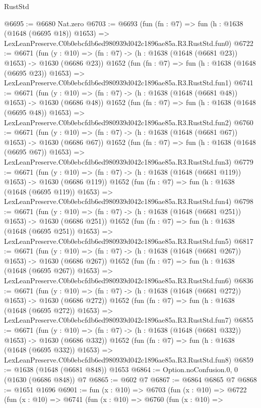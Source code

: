 \begin{lexlean}{RustStd}
\begin{coremodule}
@6695 := @6680 Nat.zero
@6703 := @6693
    (fun (fn : @7) =>
    fun (h : @1638 (@1648 (@6695 @18)) @1653) =>
    LexLeanPreserve.C0b0ebcfdb6ed980939d042c1896ae85a.R3.RustStd.fun0)
@6722 := @6671
    (fun (y : @10) => (fn : @7) -> (h : @1638 (@1648 (@6681 @23)) @1653) -> @1630 (@6686 @23))
    @1652
    (fun (fn : @7) =>
    fun (h : @1638 (@1648 (@6695 @23)) @1653) =>
    LexLeanPreserve.C0b0ebcfdb6ed980939d042c1896ae85a.R3.RustStd.fun1)
@6741 := @6671
    (fun (y : @10) => (fn : @7) -> (h : @1638 (@1648 (@6681 @48)) @1653) -> @1630 (@6686 @48))
    @1652
    (fun (fn : @7) =>
    fun (h : @1638 (@1648 (@6695 @48)) @1653) =>
    LexLeanPreserve.C0b0ebcfdb6ed980939d042c1896ae85a.R3.RustStd.fun2)
@6760 := @6671
    (fun (y : @10) => (fn : @7) -> (h : @1638 (@1648 (@6681 @67)) @1653) -> @1630 (@6686 @67))
    @1652
    (fun (fn : @7) =>
    fun (h : @1638 (@1648 (@6695 @67)) @1653) =>
    LexLeanPreserve.C0b0ebcfdb6ed980939d042c1896ae85a.R3.RustStd.fun3)
@6779 := @6671
    (fun (y : @10) => (fn : @7) -> (h : @1638 (@1648 (@6681 @119)) @1653) -> @1630 (@6686 @119))
    @1652
    (fun (fn : @7) =>
    fun (h : @1638 (@1648 (@6695 @119)) @1653) =>
    LexLeanPreserve.C0b0ebcfdb6ed980939d042c1896ae85a.R3.RustStd.fun4)
@6798 := @6671
    (fun (y : @10) => (fn : @7) -> (h : @1638 (@1648 (@6681 @251)) @1653) -> @1630 (@6686 @251))
    @1652
    (fun (fn : @7) =>
    fun (h : @1638 (@1648 (@6695 @251)) @1653) =>
    LexLeanPreserve.C0b0ebcfdb6ed980939d042c1896ae85a.R3.RustStd.fun5)
@6817 := @6671
    (fun (y : @10) => (fn : @7) -> (h : @1638 (@1648 (@6681 @267)) @1653) -> @1630 (@6686 @267))
    @1652
    (fun (fn : @7) =>
    fun (h : @1638 (@1648 (@6695 @267)) @1653) =>
    LexLeanPreserve.C0b0ebcfdb6ed980939d042c1896ae85a.R3.RustStd.fun6)
@6836 := @6671
    (fun (y : @10) => (fn : @7) -> (h : @1638 (@1648 (@6681 @272)) @1653) -> @1630 (@6686 @272))
    @1652
    (fun (fn : @7) =>
    fun (h : @1638 (@1648 (@6695 @272)) @1653) =>
    LexLeanPreserve.C0b0ebcfdb6ed980939d042c1896ae85a.R3.RustStd.fun7)
@6855 := @6671
    (fun (y : @10) => (fn : @7) -> (h : @1638 (@1648 (@6681 @332)) @1653) -> @1630 (@6686 @332))
    @1652
    (fun (fn : @7) =>
    fun (h : @1638 (@1648 (@6695 @332)) @1653) =>
    LexLeanPreserve.C0b0ebcfdb6ed980939d042c1896ae85a.R3.RustStd.fun8)
@6859 := @1638 (@1648 (@6681 @848)) @1653
@6864 := Option.noConfusion.{0, 0} (@1630 (@6686 @848)) @7
@6865 := @602 @7
@6867 := @6864 @6865 @7
@6868 := @1651 @1696
@6901 := fun (x : @10) =>
  @6703
    (fun (x : @10) =>
    @6722
      (fun (x : @10) =>
      @6741
        (fun (x : @10) =>
        @6760
          (fun (x : @10) =>

\end{coremodule}
\end{lexlean}
